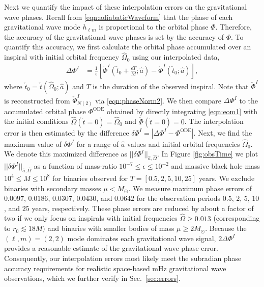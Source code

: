\documentclass[%
 reprint,
 nofootinbib,
 amsmath,amssymb,
 aps,
 prd,
]{revtex4-2}
\begin{document}
Next we quantify the impact of these interpolation errors on the gravitational wave phases. Recall from \eqref{eqn:adiabaticWaveform} that the phase of each gravitational wave mode $h_{\ell m}$ is proportional to the orbital phase $\Phi$. Therefore, the accuracy of the gravitational wave phases is set by the accuracy of $\Phi$. To quantify this accuracy, we first calculate the orbital phase accumulated over an inspiral with initial orbital frequency $\hat{\Omega}_0$ using our interpolated data,
\begin{align}
    \Delta \Phi^I &= \frac{1}{\epsilon}\left[\check{\Phi}^I\left(\check{t}_0 + \frac{\epsilon T}{M}; \hat{a} \right) - \check{\Phi}^I\left(\check{t}_0; \hat{a}\right) \right],
\end{align}
where $\check{t}_0 = \check{t}(\hat{\Omega}_0; \hat{a})$ and $T$ is the duration of the observed inspiral. Note that $\check{\Phi}^I$ is reconstructed from $\check{\Phi}^I_{N(2)}$ via \eqref{eqn:phaseNorm2}. We then compare $\Delta \Phi^I$ to the accumulated orbital phase $\Phi^\mathrm{ODE}$ obtained by directly integrating \eqref{eqn:eom1} with the initial conditions $\hat{\Omega}(\check{t}=0) = \hat{\Omega}_0$ and $\check{\Phi}(\check{t}=0) = 0$. The interpolation error is then estimated by the difference $\delta \Phi^I = |\Delta\Phi^I - \Phi^\mathrm{ODE}|$. Next, we find the maximum value of $\delta \Phi^I$ for a range of $\hat{a}$ values and initial orbital frequencies $\hat{\Omega}_0$. We denote this maximized difference as $||\delta \Phi^I||_{\hat{a},\hat{\Omega}}$. In Figure \ref{fig:obsTime} we plot $||\delta \Phi^I||_{\hat{a},\hat{\Omega}}$ as a function of mass-ratio $10^{-7} \leq \epsilon \leq 10^{-2}$ and massive black hole mass $10^{4} \leq M \leq 10^{8}$ for binaries observed for $T = [0.5, 2, 5, 10, 25]$ years. We exclude binaries with secondary masses $\mu < M_\odot$. We measure maximum phase errors of $0.0097$, $0.0186$, $0.0307$, $0.0430$, and $0.0642$ for the observation periods $0.5$, $2$, $5$, $10$, and $25$ years, respectively. These phase errors are reduced by about a factor of two if we only focus on inspirals with initial frequencies $\hat{\Omega} \geq 0.013$ (corresponding to $r_0 \lesssim 18 M)$ and binaries with smaller bodies of mass $\mu \geq 2 M_\odot$. Because the $(\ell, m) = (2,2)$ mode dominates each gravitational wave signal, $2 \Delta\Phi^I$ provides a reasonable estimate of the gravitational wave phase error. Consequently, our interpolation errors most likely meet the subradian phase accuracy requirements for realistic space-based mHz gravitational wave observations, which we further verify in Sec.~\ref{sec:errors}.
\end{document}
